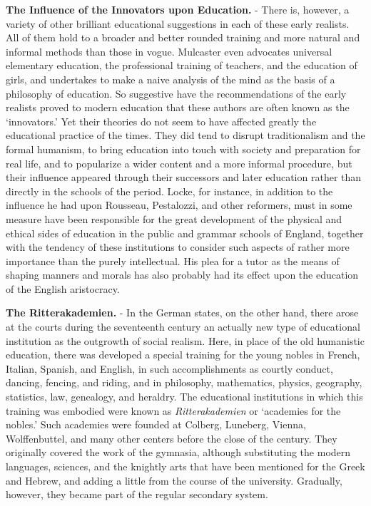 \documentclass[]{book}
\begin{document}
\textbf{The Influence of the Innovators upon Education.} - There is, however, a variety of other brilliant educational suggestions in each of these early realists. All of them hold to a broader and better rounded training and more natural and informal methods than those in vogue. Mulcaster even advocates universal elementary education, the professional training of teachers, and the education of girls, and undertakes to make a naive analysis of the mind as the basis of a philosophy of education. So suggestive have the recommendations of the early realists proved to modern education that these authors are often known as the `innovators.' Yet their theories do not seem to have affected greatly the educational practice of the times. They did tend to disrupt traditionalism and the formal humanism, to bring education into touch with society and preparation for real life, and to popularize a wider content and a more informal procedure, but their influence appeared through their successors and later education rather than directly in the schools of the period. Locke, for instance, in addition to the influence he had upon Rousseau, Pestalozzi, and other reformers, must in some measure have been responsible for the great development of the physical and ethical sides of education in the public and grammar schools of England, together with the tendency of these institutions to consider such aspects of rather more importance than the purely intellectual. His plea for a tutor as the means of shaping manners and morals has also probably had its effect upon the education of the English aristocracy.

\textbf{The Ritterakademien.} - In the German states, on the other hand, there arose at the courts during the seventeenth century an actually new type of educational institution as the outgrowth of social realism. Here, in place of the old humanistic education, there was developed a special training for the young nobles in French, Italian, Spanish, and English, in such accomplishments as courtly conduct, dancing, fencing, and riding, and in philosophy, mathematics, physics, geography, statistics, law, genealogy, and heraldry. The educational institutions in which this training was embodied were known as \emph{Ritterakademien} or `academies for the nobles.' Such academies were founded at Colberg, Luneberg, Vienna, Wolffenbuttel, and many other centers before the close of the century. They originally covered the work of the gymnasia, although substituting the modern languages, sciences, and the knightly arts that have been mentioned for the Greek and Hebrew, and adding a little from the course of the university. Gradually, however, they became part of the regular secondary system.
\end{document}
